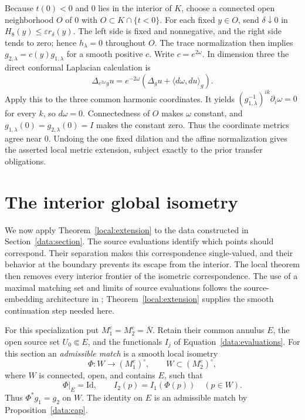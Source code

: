 \documentclass[11pt]{article}
\theoremstyle{definition}
\theoremstyle{remark}
\newcommand{\Id}{\mathrm{Id}}
\numberwithin{equation}{section}
\begin{document}
Because $t(0)<0$ and $0$ lies in the interior of $K$, choose a connected
open neighborhood $O$ of $0$ with $O\subset K\cap\{t<0\}$.
For each fixed $y\in O$, send $\delta\downarrow0$ in
$H_8(y)\leq\varepsilon r_\delta(y)$.  The left side is fixed and
nonnegative, and the right side tends to zero; hence $h_\lambda=0$
throughout $O$.  The trace normalization then implies
$g_{2,\lambda}=c(y)g_{1,\lambda}$ for a smooth positive $c$.
Write $c=e^{2\omega}$.  In dimension three the direct conformal
Laplacian calculation is
\[
 \Delta_{e^{2\omega}g}u
 =e^{-2\omega}\left(\Delta_gu+
                            \langle d\omega,du\rangle_g\right).
\]
Apply this to the three common harmonic coordinates.  It yields
$(g_{1,\lambda}^{-1})^{ik}\partial_i\omega=0$ for every $k$,
so $d\omega=0$.  Connectedness of $O$ makes $\omega$ constant,
and $g_{1,\lambda}(0)=g_{2,\lambda}(0)=I$ makes the constant zero.
Thus the coordinate metrics agree near $0$.  Undoing the one fixed
dilation and the affine normalization gives the asserted local metric
extension, subject exactly to the prior transfer obligations.

\section{The interior global isometry}
\label{global:section}

We now apply Theorem~\ref{local:extension} to the data constructed in
Section~\ref{data:section}. The source evaluations identify which
points should correspond. Their separation makes this correspondence
single-valued, and their behavior at the boundary prevents its escape
from the interior. The local theorem then removes every interior
frontier of the isometric correspondence.
The use of a maximal matching set and limits of source evaluations
follows the source-embedding architecture in
\citep[Section~6.1]{LLS20}; Theorem~\ref{local:extension} supplies the
smooth continuation step needed here.

For this specialization put $M_1^e=M_2^e=\overline N$. Retain their common annulus $E$, the open
source set $U_0\Subset E$, and the functionals $I_j$ of
Equation~\eqref{data:evaluations}. For this section an \emph{admissible
match} is a smooth local isometry
\[
 \Phi:W\longrightarrow (M_1^e)^\circ,
 \qquad W\subset(M_2^e)^\circ,
\]
where $W$ is connected, open, and contains $E$, such that
\begin{equation}\label{global:matching}
 \Phi|_E=\Id,\qquad I_2(p)=I_1(\Phi(p))\quad(p\in W).
\end{equation}
Thus $\Phi^*g_1=g_2$ on $W$. The identity on $E$ is an admissible
match by Proposition~\ref{data:cap}.
\end{document}

